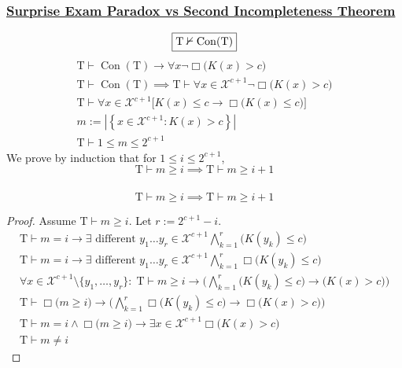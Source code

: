 \documentclass[UTF8,aspectratio=43,11pt,colorlinks,compress,openany]{beamer}%
\begin{document}
\begin{frame}\frametitle{\href{http://www.ams.org/notices/201011/rtx101101454p.pdf}{Surprise Exam Paradox vs Second Incompleteness Theorem}}
	\[\fbox{$\mathrm{T}\nvdash\operatorname{Con}(\mathrm{T})$}\]
	\begin{gather*}\label{chaitin_con}
	\mathrm{T}\vdash\operatorname{Con}(\mathrm{T})\to\forall x\neg\Box \big(K(x)>c\big)\tag{Chaitin}\\
	\mathrm{T}\vdash\operatorname{Con}(\mathrm{T})\implies\mathrm{T}\vdash\forall x\in\mathcal{X}^{c+1}\neg\Box \big(K(x)>c\big)\\
	\mathrm{T}\vdash\forall x\in\mathcal{X}^{c+1}\big[K(x)\leq c\to\Box \big(K(x)\leq c\big)\big]\tag{$\Sigma_1$-complete}\\
	m:=\left|\left\{x\in\mathcal{X}^{c+1}: K(x)>c\right\}\right|\\
	\mathrm{T}\vdash 1\leq m\leq 2^{c+1}
	\end{gather*}
	We prove by induction that for $1\leq i\leq 2^{c+1}$,
	\[\mathrm{T}\vdash m\geq i\implies\mathrm{T}\vdash m\geq i+1\]
\end{frame}

\begin{frame}\frametitle{}
	\[\mathrm{T}\vdash m\geq i\implies\mathrm{T}\vdash m\geq i+1\]
	\begin{proof}
		Assume $\mathrm{T}\vdash m\geq i$. Let $r:=2^{c+1}-i$.
		\begin{gather*}
		\mathrm{T}\vdash m=i\to\exists\mbox{ different } y_1\dots y_r\in\mathcal{X}^{c+1}\bigwedge\limits_{k=1}^r\big(K(y_k)\leq c\big)\\
		\mathrm{T}\vdash m=i\to\exists\mbox{ different } y_1\dots y_r\in\mathcal{X}^{c+1}\bigwedge\limits_{k=1}^r\Box \big(K(y_k)\leq c\big)\\
		\forall x\in\mathcal{X}^{c+1}\setminus\!\{y_1,\dots,y_r\}:\;\mathrm{T}\vdash m\geq i\to\bigg(\bigwedge\limits_{k=1}^r\big(K(y_k)\leq c\big)\to\big(K(x)>c\big)\bigg)\\
		\mathrm{T}\vdash\Box \big(m\geq i\big)\to\bigg(\bigwedge\limits_{k=1}^r\Box \big(K(y_k)\leq c\big)\to\Box \big(K(x)>c\big)\bigg)\\
		\mathrm{T}\vdash m=i\wedge\Box \big(m\geq i\big)\to\exists x\in\mathcal{X}^{c+1}\Box \big(K(x)>c\big)\\
		\mathrm{T}\vdash m\neq i
		\end{gather*}
		\vspace{-4ex}
	\end{proof}
\end{frame}
\end{document}
